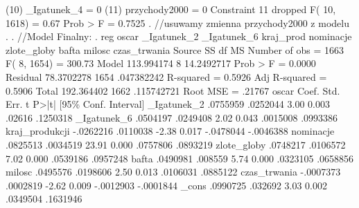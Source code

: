 \begin{stlog}
 (10)  _Igatunek_4 = 0
 (11)  przychody2000 = 0
       Constraint 11 dropped
{\smallskip}
       F( 10,  1618) =    0.67
            Prob > F =    0.7525
{\smallskip}
. //usuwamy zmienna przychody2000 z modelu
. 
. //Model Finalny:
. reg oscar _Igatunek_2 _Igatunek_6 kraj_prod nominacje zlote_globy bafta milosc czas_trwania
{\smallskip}
      Source {\VBAR}       SS       df       MS              Number of obs =    1663
           F(  8,  1654) =  300.73
       Model {\VBAR}  113.994174     8  14.2492717           Prob > F      =  0.0000
    Residual {\VBAR}  78.3702278  1654  .047382242           R-squared     =  0.5926
           Adj R-squared =  0.5906
       Total {\VBAR}  192.364402  1662  .115742721           Root MSE      =  .21767
{\smallskip}
         oscar {\VBAR}      Coef.   Std. Err.      t    P>|t|     [95\% Conf. Interval]
   _Igatunek_2 {\VBAR}   .0755959   .0252044     3.00   0.003       .02616    .1250318
   _Igatunek_6 {\VBAR}   .0504197   .0249408     2.02   0.043     .0015008    .0993386
kraj_produkcji {\VBAR}  -.0262216   .0110038    -2.38   0.017    -.0478044   -.0046388
     nominacje {\VBAR}   .0825513   .0034519    23.91   0.000     .0757806    .0893219
   zlote_globy {\VBAR}   .0748217   .0106572     7.02   0.000     .0539186    .0957248
         bafta {\VBAR}   .0490981    .008559     5.74   0.000     .0323105    .0658856
        milosc {\VBAR}   .0495576   .0198606     2.50   0.013     .0106031    .0885122
  czas_trwania {\VBAR}  -.0007373   .0002819    -2.62   0.009    -.0012903   -.0001844
         _cons {\VBAR}   .0990725    .032692     3.03   0.002     .0349504    .1631946
{\smallskip}

\end{stlog}




